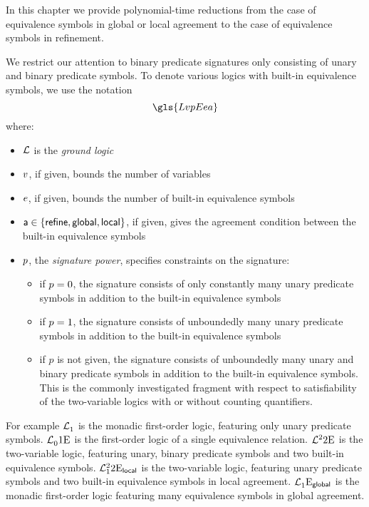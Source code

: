 In this chapter we provide polynomial-time reductions from the case of
equivalence symbols in global or local agreement to the case of equivalence
symbols in refinement.

We restrict our attention to binary predicate signatures only consisting of
unary and binary predicate symbols.
To denote various logics with built-in equivalence symbols, we use the notation
\[
  \gls{LvpEea}
\]
where:
\begin{itemize}
  \item $\mathcal{L}$ is the \emph{ground logic}
  \item $v$, if given, bounds the number of variables
  \item $e$, if given, bounds the number of built-in equivalence symbols
  \item $\mathsf{a} \in \left\{\mathsf{refine}, \mathsf{global}, \mathsf{local}\right\}$, if given, gives the
  agreement condition between the built-in equivalence symbols
  \item $p$, the \emph{signature power}, specifies constraints on the
  signature:
  \begin{itemize}
    \item if $p = 0$, the signature consists of only constantly many unary
    predicate symbols in addition to the built-in equivalence symbols
    \item if $p = 1$, the signature consists of unboundedly many unary
    predicate symbols in addition to the built-in equivalence symbols
    \item if $p$ is not given, the signature consists of unboundedly many unary
    and binary predicate symbols in addition to the built-in equivalence symbols.
    This is the commonly investigated fragment with respect to satisfiability of
    the two-variable logics with or without counting quantifiers.
  \end{itemize}
\end{itemize}

For example $\mathcal{L}^{{}}_{1}$ is the monadic first-order logic, featuring only
unary predicate symbols.
$\mathcal{L}^{{}}_{0}{1}\mathrm{E}_{{}}$ is the first-order logic of a single equivalence
relation.
$\mathcal{L}^{2}_{{}}{2}\mathrm{E}_{{}}$ is the two-variable logic, featuring unary, binary
predicate symbols and two built-in equivalence symbols.
$\mathcal{L}^{2}_{1}{2}\mathrm{E}_{\mathsf{local}}$ is the two-variable logic,
featuring unary predicate symbols and two built-in equivalence symbols in local
agreement.
$\mathcal{L}^{{}}_{1}{{}}\mathrm{E}_{\mathsf{global}}$ is the monadic first-order logic featuring
many equivalence symbols in global agreement.

